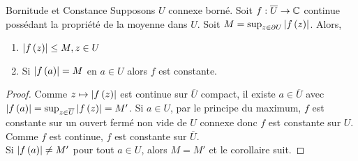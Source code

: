 \documentclass{cours}
\begin{document}
\begin{corollaire}
	{Bornitude et Constance}{}
	Supposons $U$ connexe borné. Soit $f : \overline{U} \to \mathbb{C}$ continue possédant la propriété de la moyenne dans $U$. Soit $M = \sup_{z \in \partial U} \left|f\left(z\right)\right|$. Alors, 
	\begin{enumerate}
		\item $\left|f\left(z\right)\right| \leq M, z \in U$
		\item Si $\left|f\left(a\right)\right| = M$ en $a \in U$ alors $f$ est constante.
	\end{enumerate}
\end{corollaire}
\begin{proof}
	Comme $z \mapsto \left|f\left(z\right)\right|$ est continue sur $\overline{U}$ compact, il existe $a\in \overline{U}$ avec $\left|f\left(a\right)\right| = \sup_{z \in \overline{U}}\left|f\left(z\right)\right| = M'$. Si $a \in U$, par le principe du maximum, $f$ est constante sur un ouvert fermé non vide de $U$ connexe donc $f$ est constante sur $U$. Comme $f$ est continue, $f$ est constante sur $\overline{U}$. \\
	Si $\left|f\left(a\right)\right| \neq M'$ pour tout $a \in U$, alors $M = M'$ et le corollaire suit. 
\end{proof}
\end{document}
